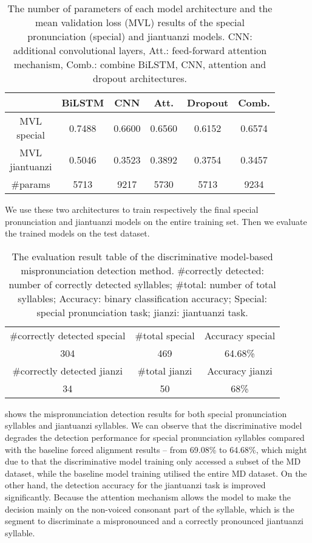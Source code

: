 \begin{table}[ht!]
\centering
\caption{The number of parameters of each model architecture and the mean validation loss (MVL) results of the special pronunciation (special) and jiantuanzi models. CNN: additional convolutional layers, Att.: feed-forward attention mechanism, Comb.: combine BiLSTM, CNN, attention and dropout architectures.}
\label{tab:ch6:results_discriminative_val}
\begin{tabular}{cccccc}
\toprule
& BiLSTM & CNN & Att. & Dropout & Comb. \\
\midrule
\makecell{MVL\\special} & 0.7488 & 0.6600 & 0.6560 & 0.6152 & 0.6574 \\
\makecell{MVL\\jiantuanzi} & 0.5046 & 0.3523 & 0.3892 & 0.3754 & 0.3457 \\
\#params & 5713 & 9217 & 5730 & 5713 & 9234 \\
\bottomrule
\end{tabular}
\end{table}

We use these two architectures to train respectively the final special pronunciation and jiantuanzi models on the entire training set. Then we evaluate the trained models on the test dataset.

\begin{table}[ht!]
\centering
\caption{The evaluation result table of the discriminative model-based mispronunciation detection method. \#correctly detected: number of correctly detected syllables; \#total: number of total syllables; Accuracy: binary classification accuracy; Special: special pronunciation task; jianzi: jiantuanzi task.}
\label{tab:ch6:results_discriminative_eval}
\begin{tabular}{ccc}
\toprule
\#correctly detected special & \#total special & Accuracy special \\
304 & 469 & 64.68\% \\
\midrule
\#correctly detected jianzi & \#total jianzi & Accuracy jianzi \\
34 & 50 & 68\% \\
\bottomrule
\end{tabular}
\end{table}

 shows the mispronunciation detection results for both special pronunciation syllables and jiantuanzi syllables. We can observe that the discriminative model degrades the detection performance for special pronunciation syllables compared with the baseline forced alignment results -- from 69.08\% to 64.68\%, which might due to that the discriminative model training only accessed a subset of the MD dataset, while the baseline model training utilised the entire MD dataset. On the other hand, the detection accuracy for the jiantuanzi task is improved significantly. Because the attention mechanism allows the model to make the decision mainly on the non-voiced consonant part of the syllable, which is the segment to discriminate a mispronounced and a correctly pronounced jiantuanzi syllable.


